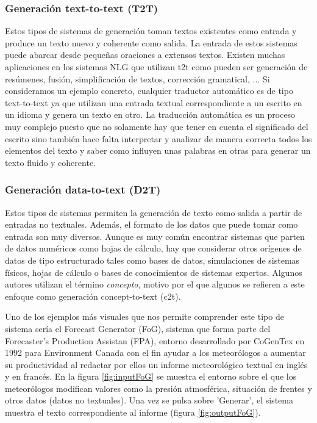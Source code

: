 \subsubsection{Generación text-to-text (T2T)}
Estos tipos de sistemas de generación toman textos existentes como entrada y produce un texto nuevo y coherente como salida. La entrada de estos sistemas puede abarcar desde pequeñas oraciones a extensos textos.
Existen muchas aplicaciones en los sistemas NLG que utilizan t2t como pueden ser generación de resúmenes, fusión, simplificación de textos, corrección gramatical, ... 
Si consideramos un ejemplo concreto, cualquier traductor automático es de tipo text-to-text ya que utilizan una entrada textual correspondiente a un escrito en un idioma y genera un texto en otro. La traducción automática es un proceso muy complejo puesto que no solamente hay que tener en cuenta el significado del escrito sino también hace falta interpretar y analizar de manera correcta todos los elementos del texto y saber como influyen unas palabras en otras para generar un texto fluido y coherente.

\subsubsection{Generación data-to-text (D2T)}
Estos tipos de sistemas permiten la generación de texto como salida a partir de entradas no textuales. Además, el formato de los datos que puede tomar como entrada son muy diversos. Aunque es muy común encontrar sistemas que parten de datos numéricos como hojas de cálculo, hay que considerar otros orígenes de datos de tipo estructurado tales como bases de datos, simulaciones de sistemas físicos, hojas de cálculo o bases de conocimientos de sistemas expertos. Algunos autores utilizan el término \textit{concepto}, motivo por el que algunos se refieren a este enfoque como generación concept-to-text (c2t). \citep{vicente2015generacion}

Uno de los ejemplos más visuales que nos permite comprender este tipo de sistema sería el Forecast Generator (FoG), sistema que forma parte del Forecaster's Production Assistan (FPA), entorno desarrollado por CoGenTex en 1992 para Environment Canada con el fin ayudar a los meteorólogos a aumentar su productividad al redactar por ellos un informe meteorológico textual en inglés y en francés. En la figura  \ref{fig:inputFoG} se muestra el entorno sobre el que los meteorólogos modifican valores como la presión atmosférica, situación de frentes y otros datos (datos no textuales). Una vez se pulsa sobre 'Generar', el sistema muestra el texto correspondiente al informe (figura \ref{fig:outputFoG}). 



